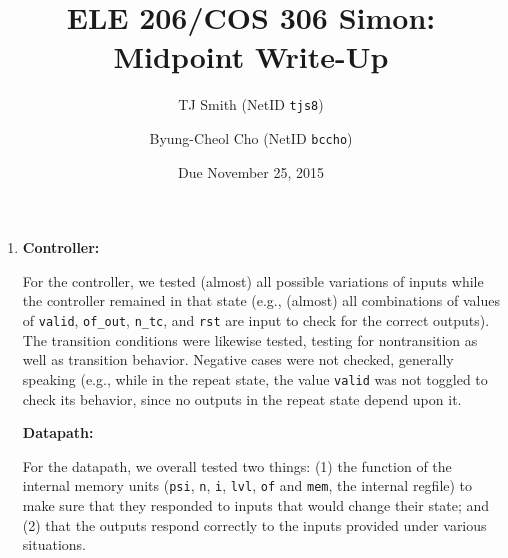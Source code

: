 \documentclass[12pt]{article}
\title{ELE 206/COS 306 Simon: Midpoint Write-Up}
\author{TJ Smith (NetID \texttt{tjs8})\and Byung-Cheol Cho (NetID \texttt{bccho})}
\date{Due November 25, 2015}
\begin{document}
\maketitle

\begin{enumerate}[label=\textbf{Question \arabic*.}]
%
\item \textbf{Controller:}

For the controller, we tested (almost) all possible variations of inputs while the controller remained in that state (e.g., (almost) all combinations of values of \texttt{valid}, \texttt{of\_out}, \texttt{n\_tc}, and \texttt{rst} are input to check for the correct outputs). The transition conditions were likewise tested, testing for non­transition as well as transition behavior. Negative cases were not checked, generally speaking (e.g., while in the repeat state, the value \texttt{valid} was not toggled to check its behavior, since no outputs in the repeat state depend upon it.

\textbf{Datapath:}

For the datapath, we overall tested two things: (1) the function of the internal memory units (\texttt{psi}, \texttt{n}, \texttt{i}, \texttt{lvl}, \texttt{of} and \texttt{mem}, the internal regfile) to make sure that they responded to inputs that would change their state; and (2) that the outputs respond correctly to the inputs provided under various situations.


\end{enumerate}
\end{document}
